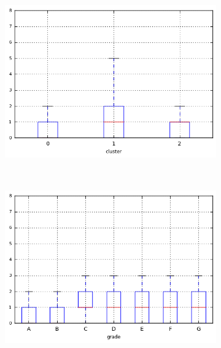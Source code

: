 \begin{anexosenv}
\begin{figure}[ht!]
\begin{subfigure}[t]{0.45\textwidth}
        \end{subfigure}
\end{figure}



\begin{figure}[ht!]
    \centering
                \caption{\emph{Boxplots} de inq\textunderscore last\textunderscore 6mths}
        \begin{subfigure}[t]{0.45\textwidth}
            \centering

            \centerline{\includegraphics[width=1.05\textwidth]{img/inq_last_6mths_by_cluster}}
        \end{subfigure}%
        ~ 
        \begin{subfigure}[t]{0.45\textwidth}
            \centering
   
            \centerline{\includegraphics[width=1.05\textwidth]{img/inq_last_6mths_by_grade}}


\end{subfigure}
\end{figure}
\end{anexosenv}
